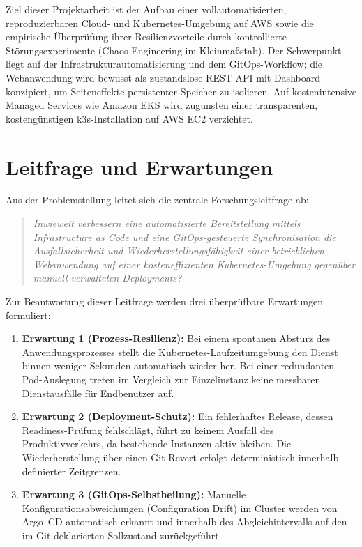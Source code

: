 Ziel dieser Projektarbeit ist der Aufbau einer vollautomatisierten, reproduzierbaren Cloud- und Kubernetes-Umgebung auf AWS sowie die empirische Überprüfung ihrer Resilienzvorteile durch kontrollierte Störungsexperimente (Chaos Engineering im Kleinmaßstab). Der Schwerpunkt liegt auf der Infrastrukturautomatisierung und dem GitOps-Workflow; die Webanwendung wird bewusst als zustandslose REST-API mit Dashboard konzipiert, um Seiteneffekte persistenter Speicher zu isolieren. Auf kostenintensive Managed Services wie Amazon EKS wird zugunsten einer transparenten, kostengünstigen k3s-Installation auf AWS EC2 verzichtet.

\section{Leitfrage und Erwartungen}
\label{sec:leitfrage-erwartungen}
Aus der Problemstellung leitet sich die zentrale Forschungsleitfrage ab:
\begin{quote}
\textit{Inwieweit verbessern eine automatisierte Bereitstellung mittels Infrastructure as Code und eine GitOps-gesteuerte Synchronisation die Ausfallsicherheit und Wiederherstellungsfähigkeit einer betrieblichen Webanwendung auf einer kosteneffizienten Kubernetes-Umgebung gegenüber manuell verwalteten Deployments?}
\end{quote}

Zur Beantwortung dieser Leitfrage werden drei überprüfbare Erwartungen formuliert:
\begin{enumerate}[noitemsep,topsep=2pt]
    \item \textbf{Erwartung 1 (Prozess-Resilienz):} Bei einem spontanen Absturz des Anwendungsprozesses stellt die Kubernetes-Laufzeitumgebung den Dienst binnen weniger Sekunden automatisch wieder her. Bei einer redundanten Pod-Auslegung treten im Vergleich zur Einzelinstanz keine messbaren Dienstausfälle für Endbenutzer auf.
    \item \textbf{Erwartung 2 (Deployment-Schutz):} Ein fehlerhaftes Release, dessen Readiness-Prüfung fehlschlägt, führt zu keinem Ausfall des Produktivverkehrs, da bestehende Instanzen aktiv bleiben. Die Wiederherstellung über einen Git-Revert erfolgt deterministisch innerhalb definierter Zeitgrenzen.
    \item \textbf{Erwartung 3 (GitOps-Selbstheilung):} Manuelle Konfigurationsabweichungen (Configuration Drift) im Cluster werden von Argo~CD automatisch erkannt und innerhalb des Abgleichintervalls auf den im Git deklarierten Sollzustand zurückgeführt.
\end{enumerate}

